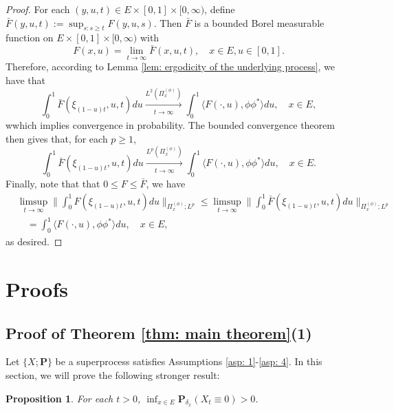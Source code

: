 \documentclass[12pt, a4paper]{amsart}
\newtheorem{prop}[thm]{Proposition}
\theoremstyle{definition}
\numberwithin{equation}{section}
\begin{document}
\begin{proof}
	For each $(y,u,t)\in E\times [0,1]\times [0,\infty)$, define $\bar F(y,u,t) := \sup_{s:s\geq t} F(y,u,s)$.
	Then $\bar F$ is a bounded Borel measurable function on $E\times [0,1]\times [0,\infty)$ with
\[
	F(x,u)
	= \lim_{t\to \infty} \bar F(x,u,t),
	\quad x\in E, u\in [0,1].
\]
	Therefore, according to Lemma \ref{lem: ergodicity of the underlying process}, we have that
\[
	\int_0^1 \bar F(\xi_{(1-u)t},u,t) du
	\xrightarrow[t\to \infty]{L^2(\Pi_x^{(\phi)})}
	\int_0^1 \langle F(\cdot , u), \phi\phi^*\rangle du,
	\quad x\in E,
\]
wwhich implies convergence in probability.
	The bounded convergence theorem then gives that, for each $p \geq 1$,
\[
	\int_0^1 \bar F(\xi_{(1-u)t},u,t) du
	\xrightarrow[t\to \infty]{L^p(\Pi_x^{(\phi)})}
	\int_0^1 \langle F(\cdot , u), \phi\phi^*\rangle du,
	\quad x\in E.
\]
	Finally, note that that $0\leq F \leq \bar F$, we have
\[\begin{split}
	& \limsup_{ t \to \infty}  \Big\| \int_0^1 F(\xi_{(1-u) t },u,t) du  \Big\|_{\Pi_x^{(\phi)};L^p}
	\leq 	\limsup_{ t \to \infty}  \Big\| \int_0^1 \bar F(\xi_{(1-u) t },u,t) du  \Big\|_{\Pi_x^{(\phi)};L^p}
	\\& \quad = \int_0^1 \langle F(\cdot, u), \phi \phi^*\rangle du,
	\quad x\in E,
\end{split}\]
	as desired.
\end{proof}

\section{Proofs}
\subsection{Proof of Theorem \ref{thm: main theorem}(1)}
\label{sec: proof of result 1}
	Let $\{X; \mathbf P\}$ be a superprocess satisfies 
	Assumptions \ref{asp: 1}-\ref{asp: 4}.
    In this section, we will prove the following stronger result:

\begin{prop}
\label{prop: non-presistent}
	For each $t > 0$, $\inf_{x\in E} \mathbf P_{\delta_x}(X_t \equiv 0) > 0$.
\end{prop}
\end{document}
